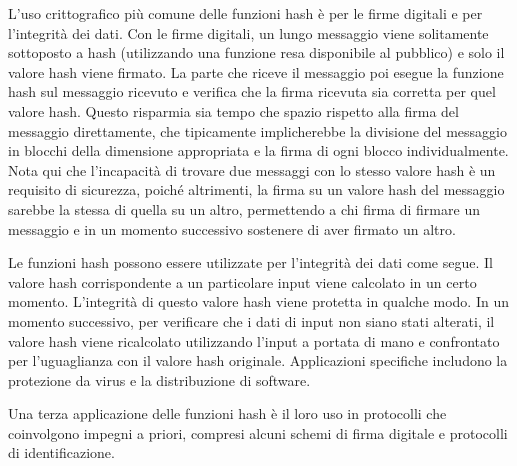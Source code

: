 \documentclass{article}
\theoremstyle{definition}
\begin{document}
L'uso crittografico più comune delle funzioni hash è per le firme digitali e per l'integrità dei dati. Con le firme digitali, un lungo messaggio viene solitamente sottoposto a hash (utilizzando una funzione resa disponibile al pubblico) e solo il valore hash viene firmato. La parte che riceve il messaggio poi esegue la funzione hash sul messaggio ricevuto e verifica che la firma ricevuta sia corretta per quel valore hash. Questo risparmia sia tempo che spazio rispetto alla firma del messaggio direttamente, che tipicamente implicherebbe la divisione del messaggio in blocchi della dimensione appropriata e la firma di ogni blocco individualmente. Nota qui che l'incapacità di trovare due messaggi con lo stesso valore hash è un requisito di sicurezza, poiché altrimenti, la firma su un valore hash del messaggio sarebbe la stessa di quella su un altro, permettendo a chi firma di firmare un messaggio e in un momento successivo sostenere di aver firmato un altro.

Le funzioni hash possono essere utilizzate per l'integrità dei dati come segue. Il valore hash corrispondente a un particolare input viene calcolato in un certo momento. L'integrità di questo valore hash viene protetta in qualche modo. In un momento successivo, per verificare che i dati di input non siano stati alterati, il valore hash viene ricalcolato utilizzando l'input a portata di mano e confrontato per l'uguaglianza con il valore hash originale. Applicazioni specifiche includono la protezione da virus e la distribuzione di software.

Una terza applicazione delle funzioni hash è il loro uso in protocolli che coinvolgono impegni a priori, compresi alcuni schemi di firma digitale e protocolli di identificazione.

    
    
    
\end{document}

